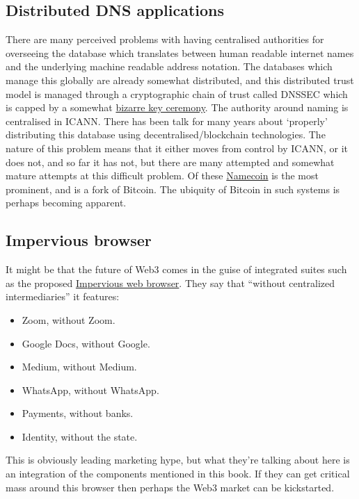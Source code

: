 \subsection{Distributed DNS applications} 
There are many perceived problems with having centralised authorities for overseeing the database which translates between human readable internet names and the underlying machine readable address notation. The databases which manage this globally are already somewhat distributed, and this distributed trust model is managed through a cryptographic chain of trust called DNSSEC which is capped by a somewhat \href{https://www.iana.org/dnssec/ceremonies}{bizarre key ceremony}. The authority around naming is centralised in ICANN. There has been talk for many years about `properly' distributing this database using decentralised/blockchain technologies\cite{karaarslan2018blockchain}. The nature of this problem means that it either moves from control by ICANN, or it does not, and so far it has not, but there are many attempted and somewhat mature attempts at this difficult problem. Of these \href{https://www.namecoin.org/}{Namecoin} is the most prominent, and is a fork of Bitcoin. The ubiquity of Bitcoin in such systems is perhaps becoming apparent.
\subsection{Impervious browser}
It might be that the future of Web3 comes in the guise of integrated suites such as the proposed \href{https://newsletter.impervious.ai/impervious-browser-functionality-overview/}{Impervious web browser}. They say that ``without centralized intermediaries'' it features:
\begin{itemize}
\item    Zoom, without Zoom.
\item    Google Docs, without Google.
\item    Medium, without Medium.
\item    WhatsApp, without WhatsApp.
\item    Payments, without banks.
\item   Identity, without the state.
\end{itemize}
This is obviously leading marketing hype, but what they're talking about here is an integration of the components mentioned in this book. If they can get critical mass around this browser then perhaps the Web3 market can be kickstarted.
